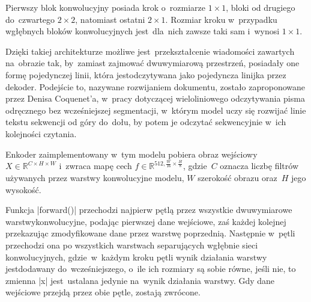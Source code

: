 Pierwszy blok konwolucyjny posiada krok o~rozmiarze $1 \times 1$, bloki od drugiego do~czwartego $2\times 2$, natomiast ostatni $2 \times 1$. Rozmiar kroku w~przypadku wgłębnych bloków konwolucyjnych jest~dla~nich zawsze taki sam i~wynosi $1 \times 1$.

Dzięki takiej architekturze możliwe jest~przekształcenie wiadomości zawartych na~obrazie tak, by~zamiast zajmować dwuwymiarową przestrzeń, posiadały one formę pojedynczej linii, która jest\linebreak odczytywana jako pojedyncza linijka przez dekoder. Podejście to, nazywane rozwijaniem dokumentu, zostało zaproponowane przez Denisa Coquenet'a, w~pracy dotyczącej wieloliniowego odczytywania pisma odręcznego bez wcześniejszej segmentacji\cite{Coquenet2021}, w~którym model uczy się rozwijać linie tekstu sekwencji od góry do~dołu, by potem je odczytać sekwencyjnie w~ich kolejności czytania. 

Enkoder zaimplementowany w~tym modelu pobiera obraz wejściowy $X \in \mathbb{R}^{C\times H \times W}$ i~zwraca mapę cech $f \in \mathbb{R}^{512, \frac{W}{16}\times\frac{H}{8}}$, gdzie~$C$ oznacza liczbę filtrów używanych przez warstwy konwolucyjne modelu, $W$ szerokość obrazu oraz~$H$ jego wysokość.

Funkcja \pyth|forward()| przechodzi najpierw pętlą przez wszystkie dwuwymiarowe warstwy\linebreak konwolucyjne, podając pierwszej dane wejściowe, zaś każdej kolejnej przekazując zmodyfikowane dane przez warstwę poprzednią. Następnie w~pętli przechodzi ona po wszystkich warstwach separujących wgłębnie sieci konwolucyjnych, gdzie~w~każdym kroku pętli wynik działania warstwy jest\linebreak dodawany do~wcześniejszego, o~ile ich rozmiary są sobie równe, jeśli nie, to zmienna \pyth|x| jest~ustalana jedynie na~wynik działania warstwy. Gdy dane wejściowe przejdą przez obie pętle, zostają zwrócone.

\newpage


